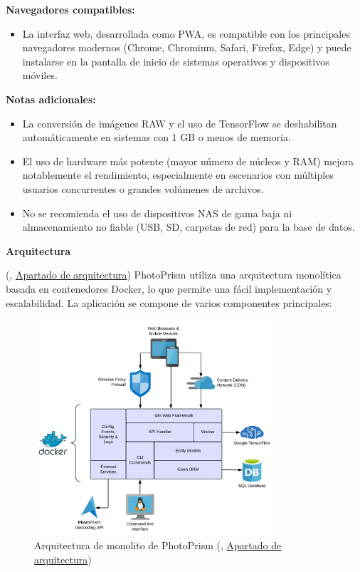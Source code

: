 \textbf{Navegadores compatibles:}
\begin{itemize}
    \item La interfaz web, desarrollada como PWA, es compatible con los principales navegadores modernos (Chrome, Chromium, Safari, Firefox, Edge) y puede instalarse en la pantalla de inicio de sistemas operativos y dispositivos móviles.
\end{itemize}

\textbf{Notas adicionales:}
\begin{itemize}
    \item La conversión de imágenes RAW y el uso de TensorFlow se deshabilitan automáticamente en sistemas con 1 GB o menos de memoria.
    \item El uso de hardware más potente (mayor número de núcleos y RAM) mejora notablemente el rendimiento, especialmente en escenarios con múltiples usuarios concurrentes o grandes volúmenes de archivos.
    \item No se recomienda el uso de dispositivos NAS de gama baja ni almacenamiento no fiable (USB, SD, carpetas de red) para la base de datos.
\end{itemize}

\textbf{Arquitectura}

(\cite{photoprism-documentation}, \href{https://www.photoprism.app/kb/architecture}{Apartado de arquitectura}) PhotoPrism utiliza una arquitectura monolítica basada en contenedores Docker, lo que permite una fácil implementación y escalabilidad. La aplicación se compone de varios componentes principales:

\begin{figure}[h]
  \centering
  \includegraphics[width=0.8\textwidth]{assets/photoprism-modules.png}
  \caption{Arquitectura de monolito de PhotoPrism (\cite{photoprism-documentation}, \href{https://www.photoprism.app/kb/architecture}{Apartado de arquitectura})}
  \label{fig:photoprism-modules}
\end{figure}

